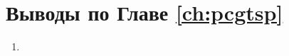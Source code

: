 
\section{Выводы по Главе \ref{ch:pcgtsp}}
\label{sec:pcgtsp.conclude}

\begin{enumerate}
  \item
\end{enumerate}
